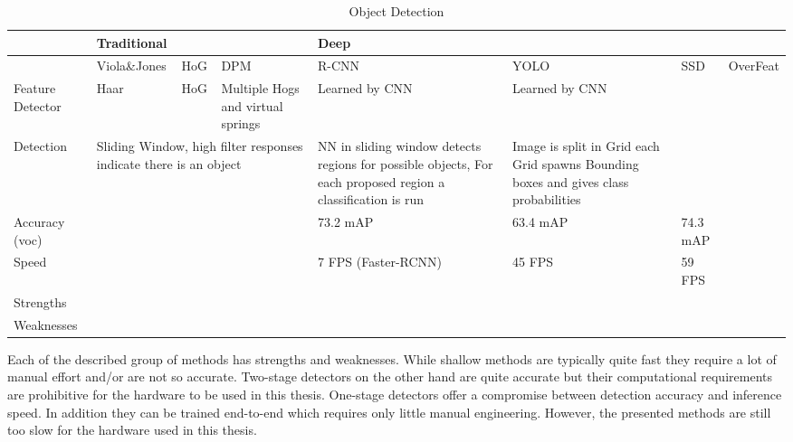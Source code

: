 \begin{table}[]
	
	\caption{Object Detection}
	\label{my-label}
	\begin{tabular}{|p{3cm}|p{3cm}|p{3cm}|p{3cm}|p{3cm}|p{3cm}|p{3cm}|p{3cm}|}
		\hline
		& \multicolumn{3}{l|}{Traditional} & \multicolumn{4}{l|}{Deep}   \\ \hline
		& Viola\&Jones    				   & HoG    & DPM   		   & R-CNN    & YOLO         & SSD & OverFeat \\ \hline
		Feature Detector & Haar					   & HoG    & Multiple Hogs and virtual springs   & Learned by CNN     &  Learned by CNN            & & \\ \hline
		Detection & \multicolumn{3}{l|}{Sliding Window, high filter responses indicate there is an object} & NN in sliding window detects regions for possible objects, For each proposed region a classification is run & Image is split in Grid each Grid spawns Bounding boxes and gives class probabilities & & \\
		\hline
		Accuracy (voc) &  & & & 73.2 mAP & 63.4 mAP & 74.3 mAP & \\ 
		\hline
		Speed & & & & 7 FPS (Faster-RCNN) & 45 FPS & 59 FPS & \\
		\hline
		Strengths & & & & & &  &\\
		\hline
		Weaknesses & & & & & &  &\\
		\hline
		\end{tabular}
		
		\end{table}

Each of the described group of methods has strengths and weaknesses. While shallow methods are typically quite fast they require a lot of manual effort and/or are not so accurate. Two-stage detectors on the other hand are quite accurate but their computational requirements are prohibitive for the hardware to be used in this thesis. One-stage detectors offer a compromise between detection accuracy and inference speed. In addition they can be trained end-to-end which requires only little manual engineering. However, the presented methods are still too slow for the hardware used in this thesis.
